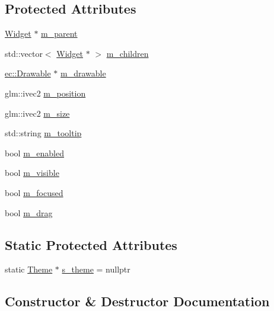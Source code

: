\subsection*{Protected Attributes}
\begin{DoxyCompactItemize}
\item 
\mbox{\hyperlink{classec__gui_1_1_widget}{Widget}} $\ast$ \mbox{\hyperlink{classec__gui_1_1_widget_a49b565b75e72cf4535e3d61e87cc25f8}{m\+\_\+parent}}
\item 
std\+::vector$<$ \mbox{\hyperlink{classec__gui_1_1_widget}{Widget}} $\ast$ $>$ \mbox{\hyperlink{classec__gui_1_1_widget_ad80b6bc6ae666273b733246001f3c277}{m\+\_\+children}}
\item 
\mbox{\hyperlink{classec_1_1_drawable}{ec\+::\+Drawable}} $\ast$ \mbox{\hyperlink{classec__gui_1_1_widget_a9f35ffedabfbd15d9de62b82509376d3}{m\+\_\+drawable}}
\item 
glm\+::ivec2 \mbox{\hyperlink{classec__gui_1_1_widget_ac18ec15d2929f5a7e37461bab8ee34c0}{m\+\_\+position}}
\item 
glm\+::ivec2 \mbox{\hyperlink{classec__gui_1_1_widget_a01846fa7b80a21aa7fed1813a29b7cc2}{m\+\_\+size}}
\item 
std\+::string \mbox{\hyperlink{classec__gui_1_1_widget_ade1a9106e3877f2f56ea1473b4964c74}{m\+\_\+tooltip}}
\item 
bool \mbox{\hyperlink{classec__gui_1_1_widget_a6df52d208d536654a4216f5de8c78aad}{m\+\_\+enabled}}
\item 
bool \mbox{\hyperlink{classec__gui_1_1_widget_ac9266ce41736476342354d016d4535b2}{m\+\_\+visible}}
\item 
bool \mbox{\hyperlink{classec__gui_1_1_widget_a6eefde861da81a8319956a4d56c4337c}{m\+\_\+focused}}
\item 
bool \mbox{\hyperlink{classec__gui_1_1_widget_a811ede6c4aae70632efd37eebfef0b0b}{m\+\_\+drag}}
\end{DoxyCompactItemize}
\subsection*{Static Protected Attributes}
\begin{DoxyCompactItemize}
\item 
static \mbox{\hyperlink{classec__gui_1_1_theme}{Theme}} $\ast$ \mbox{\hyperlink{classec__gui_1_1_widget_aabaff3a7961627152cd9555631be45ec}{s\+\_\+theme}} = nullptr
\end{DoxyCompactItemize}


\subsection{Constructor \& Destructor Documentation}
\mbox{\label{classec__gui_1_1_widget_a9371f37c8a4825bc11058c0624641575}} 
